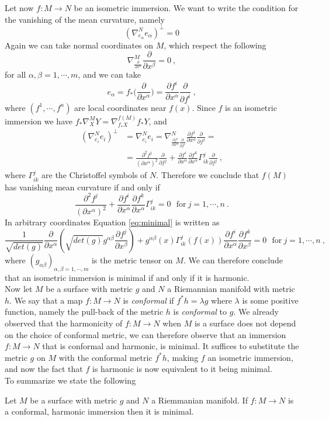 Let now $f:M \to N$ be an isometric immersion. We want to write the condition for the vanishing of the mean curvature, namely
\[
    (\nabla^N_{e_\alpha} e_\alpha)^\perp = 0
\]
Again we can take normal coordinates on $M$, which respect the following
\[
    \nabla^M_{\frac{\partial}{\partial x^\alpha}}  \frac{\partial}{\partial x^\beta} = 0 \ ,
\]
for all $\alpha, \beta = 1, \cdots, m$, and we can take
\[
    e_\alpha = f_*\Big( \frac{\partial}{\partial x^\alpha} \Big) = \frac{\partial f^i}{\partial x^\alpha} \frac{\partial}{\partial f^i} \ ,
\]
where $(f^1, \cdots, f^n)$ are local coordinates near $f(x)$.
Since $f$ is an isometric immersion we have $f_* \nabla^M_X Y = \nabla^{f(M)}_{f_* X} f_* Y$, and
\[
\begin{split}
    (\nabla^N_{e_i} e_i)^\perp & = \nabla^N_{e_i} e_i = \nabla^N_{\frac{\partial f^i}{\partial x^\alpha} \frac{\partial}{\partial f^i}}  \frac{\partial f^j}{\partial x^\alpha} \frac{\partial}{\partial f^j} = \\
    & = \frac{\partial^2 f^j}{(\partial x^\alpha)^2} \frac{\partial}{\partial f^j} + \frac{\partial f^i}{\partial x^\alpha} \frac{\partial f^k}{\partial x^\alpha} \Gamma^j_{ik} \frac{\partial}{\partial f^j} \ ,
\end{split}
\]
where $\Gamma^j_{ik}$ are the Christoffel symbols of $N$. Therefore we conclude that $f(M)$ has vanishing mean curvature if and only if
\begin{equation}\label{eq:minimal}
    \frac{\partial^2 f^j}{(\partial x^\alpha)^2} + \frac{\partial f^i}{\partial x^\alpha} \frac{\partial f^k}{\partial x^\alpha} \Gamma^j_{ik}  = 0 \ \ \ \text{for} \ j=1, \cdots, n \ .
\end{equation}
In arbitrary coordinates Equation \ref{eq:minimal} is written as
\[
    \frac{1}{\sqrt{det(g)}} \frac{\partial}{\partial x^\alpha}(\sqrt{det(g)} g^{\alpha\beta} \frac{\partial f^j}{\partial x^\beta}) + g^{\alpha\beta}(x) \Gamma^j_{ik}(f(x)) \frac{\partial f^i}{\partial x^\alpha}  \frac{\partial f^k}{\partial x^\beta} = 0  \ \ \ \text{for} \ j=1, \cdots, n \ ,
\]
where $(g_{\alpha \beta})_{\alpha,\beta = 1,\cdots,m}$ is the metric tensor on $M$.
We can therefore conclude that an isometric immersion is minimal if and only if it is harmonic.\\
Now let $M$ be a surface with metric $g$ and $N$ a Riemannian manifold with metric $h$. We say that a map $f:M \to N$ is \textit{conformal} if $f^* h = \lambda g$ where $\lambda$ is some positive function, namely the pull-back of the metric $h$ is \textit{conformal} to $g$. We already observed that the harmonicity of $f:M \to N$ when $M$ is a surface does not depend on the choice of conformal metric, we can therefore observe that an immersion $f:M \to N$ that is conformal and harmonic, is minimal. It suffices to substitute the metric $g$ on $M$ with the conformal metric $f^* h$, making $f$ an isometric immersion, and now the fact that $f$ is harmonic is now equivalent to it being minimal.\\
To summarize we state the following
\begin{theorem}\label{thm:minimal}
    Let $M$ be a surface with metric $g$ and $N$ a Riemmanian manifold. If $f: M \to N$ is a conformal, harmonic immersion then it is minimal.
\end{theorem}
